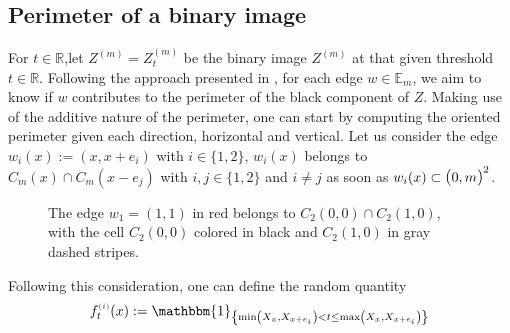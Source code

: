 \documentclass[12pt]{article}
\theoremstyle{Theorem}
\begin{document}
\subsection{Perimeter of a binary image}\label{methods}
For $t \in \mathbb{R}$,let $Z^{\scriptscriptstyle (m)} = Z^{\scriptscriptstyle (m)}_{t}$ be the  binary image  $Z^{\scriptscriptstyle (m)}$ at that given threshold $t \in \mathbb{R}$. Following  the approach  presented in \cite{HermineAgnes},  for each edge $w \in \mathbb{E}_{m}$, we aim to know if  $w$ contributes  to the perimeter of the black component of $Z$. Making use of the additive nature of the perimeter, one can start by computing the oriented perimeter given each direction, horizontal and vertical. Let us consider the edge $w_{i}(x) := \left(x, x+e_{i}\right)$ with $i \in \{1,2\}$, $w_{i}(x)$ belongs to $C_{m}(x) \cap C_{m}(x-e_{j})$ with $i,j \in \{1,2\}$ and $i \neq j$ as soon as $w_{i}(x) \subset  \text{\larger[1]{$($}}0, m \text{\larger[1]{$)$}}^{2}$.
\begin{figure}[H]
\begin{center}
\end{center}
\vspace{-0.25cm}
\caption{The edge $w_{1} = (1,1)$ in red belongs to $C_{2}(0,0) \cap C_{2}(1, 0)$, with the cell $C_{2}(0,0)$ colored in black and $C_{2}(1, 0)$ in gray dashed stripes.}
\label{fig1}
\end{figure}
\vspace{-0.5cm}
Following this consideration, one can define the random quantity
\begin{equation}
f_{t}^{\scriptscriptstyle (i)}(x) := \mathbbm{1}_{\left\{\min\left(X_{x}, X_{\scriptscriptstyle x +e_{i}}\right) < t \leq \max\left(X_{x}, X_{\scriptscriptstyle x+e_{i}}\right)\right\}}
\label{fi}
\end{equation}
\end{document}
